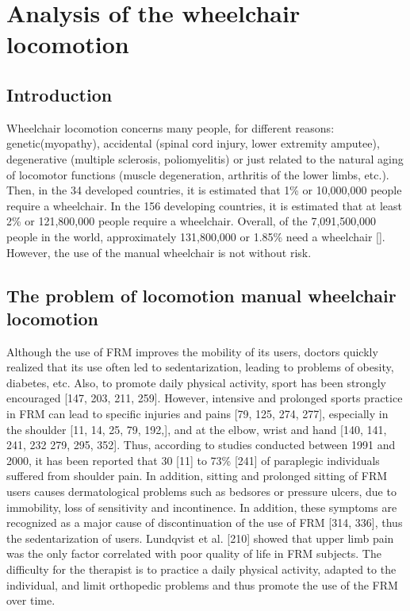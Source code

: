 \chapter{Analysis of the wheelchair locomotion}

\section{Introduction}
Wheelchair locomotion concerns many people, for different reasons: genetic(myopathy), accidental (spinal cord injury, lower extremity amputee), degenerative (multiple sclerosis, poliomyelitis) or just related to the natural aging of locomotor functions (muscle degeneration, arthritis of the lower limbs, etc.). Then, in the 34 developed countries, it is estimated that 1\% or 10,000,000 people require a wheelchair. In the 156 developing countries, it is estimated that at least 2\% or 121,800,000 people require a wheelchair. Overall, of the 7,091,500,000 people in the world, approximately 131,800,000 or 1.85\% need a wheelchair [].%
However, the use of the manual wheelchair is not without risk.

\section{The problem of locomotion manual wheelchair locomotion}

Although the use of FRM improves the mobility of its users, doctors quickly realized that its use often led to sedentarization, leading to problems of obesity, diabetes, etc. Also, to promote daily physical activity, sport has been strongly encouraged [147, 203, 211, 259]. However, intensive and prolonged sports practice in FRM can lead to specific injuries and pains [79, 125, 274, 277], especially in the shoulder [11, 14, 25, 79, 192,], and at the elbow, wrist and hand [140, 141, 241, 232 279, 295, 352]. Thus, according to studies conducted between 1991 and 2000, it has been reported that 30 [11] to 73\% [241] of paraplegic individuals suffered from shoulder pain. In addition, sitting and prolonged sitting of FRM users causes dermatological problems such as bedsores or pressure ulcers, due to immobility, loss of sensitivity and incontinence. In addition, these symptoms are recognized as a major cause of discontinuation of the use of FRM [314, 336], thus the sedentarization of users. Lundqvist et al. [210] showed that upper limb pain was the only factor correlated with poor quality of life in FRM subjects. The difficulty for the therapist is to practice a daily physical activity, adapted to the individual, and limit orthopedic problems and thus promote the use of the FRM over time.


